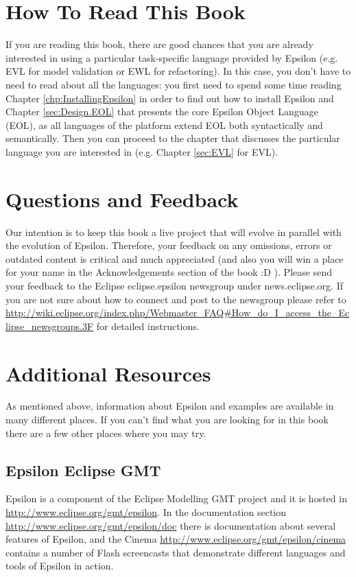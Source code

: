 \section{How To Read This Book}

If you are reading this book, there are good chances that you are already interested in using a particular task-specific language provided by Epsilon (e.g. EVL for model validation or EWL for refactoring). In this case, you don't have to need to read about all the languages: you first need to spend some time reading Chapter \ref{chp:InstallingEpsilon} in order to find out how to install Epsilon and Chapter \ref{sec:Design.EOL} that presents the core Epsilon Object Language (EOL), as all languages of the platform extend EOL both syntactically and semantically. Then you can proceed to the chapter that discusses the particular language you are interested in (e.g. Chapter \ref{sec:EVL} for EVL).

\section{Questions and Feedback}

Our intention is to keep this book a live project that will evolve in parallel with the evolution of Epsilon. Therefore, your feedback on any omissions, errors or outdated content is critical and much appreciated (and also you will win a place for your name in the Acknowledgements section of the book :D ). Please send your feedback to the Eclipse eclipse.epsilon newsgroup under news.eclipse.org. If you are not sure about how to connect and post to the newsgroup please refer to \url{http://wiki.eclipse.org/index.php/Webmaster_FAQ#How_do_I_access_the_Eclipse_newsgroups.3F} for detailed instructions.

\section{Additional Resources}

As mentioned above, information about Epsilon and examples are available in many different places. If you can't find what you are looking for in this book there are a few other places where you may try.

\subsection{Epsilon Eclipse GMT}
Epsilon is a component of the Eclipse Modelling GMT project and it is hosted in \url{http://www.eclipse.org/gmt/epsilon}. In the documentation section \url{http://www.eclipse.org/gmt/epsilon/doc} there is documentation about several features of Epsilon, and the Cinema \url{http://www.eclipse.org/gmt/epsilon/cinema} contains a number of Flash screencasts that demonstrate different languages and tools of Epsilon in action.


